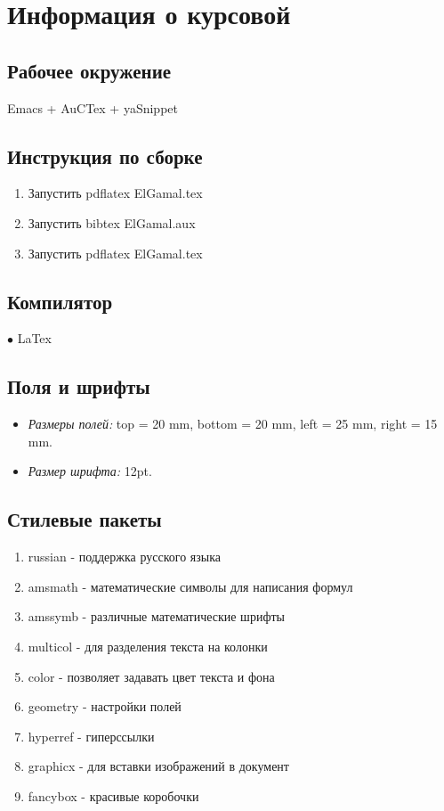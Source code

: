 \documentclass[a4paper,12pt]{report}
\begin{document}
\nocite{*}




\chapter{Информация о курсовой}


\section{Рабочее окружение}

Emacs + AuCTex + yaSnippet

\section{Инструкция по сборке}

\begin{enumerate}
  \item Запустить pdflatex ElGamal.tex 
  \item Запустить bibtex ElGamal.aux
  \item Запустить pdflatex ElGamal.tex
\end{enumerate}
\section{Компилятор}

$\bullet$ LaTex

\section{Поля и шрифты}

\begin{itemize}
\item \textit{Размеры полей:} top = 20 mm, bottom = 20 mm, left = 25 mm, right = 15 mm. 
\item \textit{Размер шрифта:} 12pt.
\end{itemize}

\section{Стилевые пакеты}

\begin{enumerate}
\item russian  - поддержка русского языка
\item amsmath - математические символы для написания формул
\item amssymb - различные математические шрифты
\item multicol - для разделения текста на колонки
\item color - позволяет задавать цвет текста и фона
\item geometry - настройки полей 
\item hyperref - гиперссылки 
\item graphicx - для вставки изображений в документ
\item fancybox - красивые коробочки
\end{enumerate}
\end{document}
